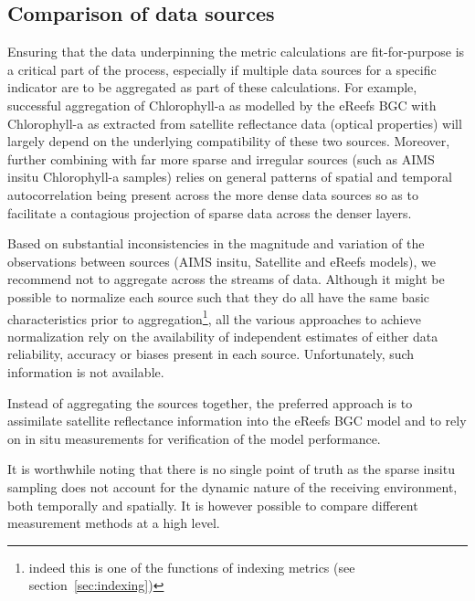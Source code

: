\subsection{Comparison of data sources}

Ensuring that the data underpinning the metric calculations are fit-for-purpose is a critical part
of the process, especially if multiple data sources for a specific indicator are to be aggregated as
part of these calculations.  For example, successful aggregation of Chlorophyll-a as modelled by the
eReefs BGC with Chlorophyll-a as extracted from satellite reflectance data (optical properties) will
largely depend on the underlying compatibility of these two sources.  Moreover, further combining
with far more sparse and irregular sources (such as AIMS insitu Chlorophyll-a samples) relies on
general patterns of spatial and temporal autocorrelation being present across the more dense data
sources so as to facilitate a contagious projection of sparse data across the denser layers.


Based on substantial inconsistencies in the magnitude and variation of the observations between
sources (AIMS insitu, Satellite and eReefs models), we recommend not to aggregate across the
streams of data.  Although it might be possible to normalize each source such that they do all have
the same basic characteristics prior to aggregation\footnote{indeed this is one of the functions of
indexing metrics (see section~\ref{sec:indexing})}, all the various approaches to achieve
normalization rely on the availability of independent estimates of either data reliability, accuracy
or biases present in each source.  Unfortunately, such information is not available.

Instead of aggregating the sources together, the preferred approach is to assimilate satellite
reflectance information into the eReefs BGC model and to rely on in situ measurements for
verification of the model performance.

It is worthwhile noting that there is no single point of truth as the sparse insitu sampling does
not account for the dynamic nature of the receiving environment, both temporally and spatially.  It
is however possible to compare different measurement methods at a high level.

